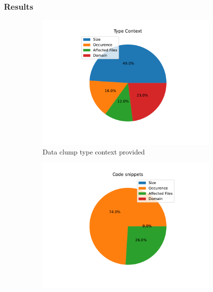 \subsubsection{Results}

\begin{figure}
    \centering
    \begin{subfigure}[b]{0.4\textwidth}
    \includegraphics[width=1\columnwidth]{figures/chapter5/filter_reason_Type_Context.pdf}
     \caption{Data clump type context provided}
    \label{fig:pie_filter_data_clump_type_context}
    \end{subfigure}
        \begin{subfigure}[b]{0.4\textwidth}
    \includegraphics[width=1\columnwidth]{figures/chapter5/filter_reason_Code_snippets.pdf}

\end{subfigure}
\end{figure}
